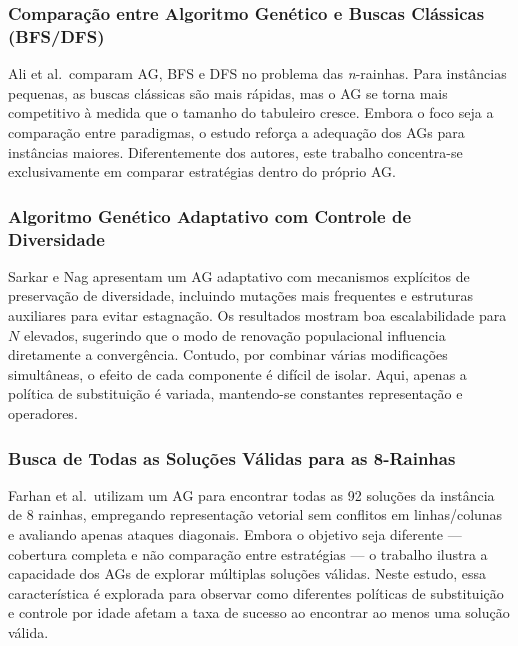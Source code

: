 \subsubsection{Comparação entre Algoritmo Genético e Buscas Clássicas (BFS/DFS) \cite{ali2023performance}}

Ali et al.\ comparam AG, BFS e DFS no problema das \textit{n}-rainhas. Para instâncias pequenas, as buscas clássicas são mais rápidas, mas o AG se torna mais competitivo à medida que o tamanho do tabuleiro cresce. Embora o foco seja a comparação entre paradigmas, o estudo reforça a adequação dos AGs para instâncias maiores. Diferentemente dos autores, este trabalho concentra-se exclusivamente em comparar estratégias dentro do próprio AG.

\subsubsection{Algoritmo Genético Adaptativo com Controle de Diversidade \cite{sarkar2017adaptive}}

Sarkar e Nag apresentam um AG adaptativo com mecanismos explícitos de preservação de diversidade, incluindo mutações mais frequentes e estruturas auxiliares para evitar estagnação. Os resultados mostram boa escalabilidade para $N$ elevados, sugerindo que o modo de renovação populacional influencia diretamente a convergência. Contudo, por combinar várias modificações simultâneas, o efeito de cada componente é difícil de isolar. Aqui, apenas a política de substituição é variada, mantendo-se constantes representação e operadores.

\subsubsection{Busca de Todas as Soluções Válidas para as 8-Rainhas \cite{farhan2015solving}}

Farhan et al.\ utilizam um AG para encontrar todas as 92 soluções da instância de 8 rainhas, empregando representação vetorial sem conflitos em linhas/colunas e avaliando apenas ataques diagonais. Embora o objetivo seja diferente — cobertura completa e não comparação entre estratégias — o trabalho ilustra a capacidade dos AGs de explorar múltiplas soluções válidas. Neste estudo, essa característica é explorada para observar como diferentes políticas de substituição e controle por idade afetam a taxa de sucesso ao encontrar ao menos uma solução válida.